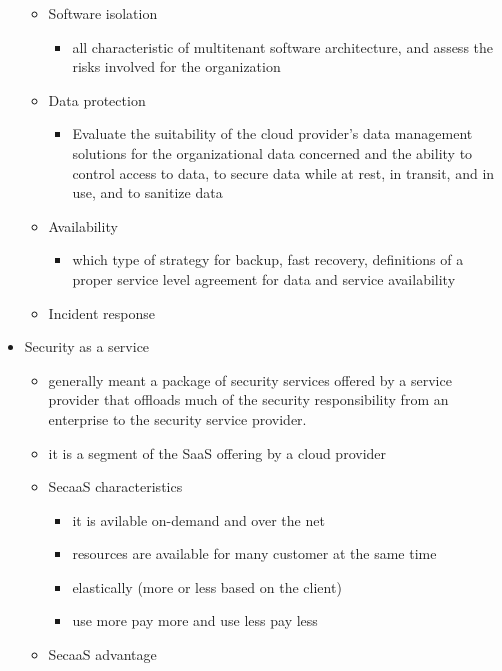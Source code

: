 \documentclass{article}
\begin{document}
\begin{itemize}
\begin{itemize}
\begin{itemize}
        \end{itemize}
        \item Software isolation
        \begin{itemize}
            \item all characteristic of multitenant software architecture, and assess the risks involved for the organization
        \end{itemize}
        \item Data protection
        \begin{itemize}
            \item Evaluate the suitability of the cloud provider’s data management solutions for the organizational data concerned and the ability to control access to data, to secure data while at rest, in transit, and in use, and to sanitize data
        \end{itemize}
        \item Availability
        \begin{itemize}
            \item which type of strategy for backup, fast recovery, definitions of a proper service level agreement for data and service availability
        \end{itemize}
        \item Incident response
    \end{itemize}
    \item Security as a service
    \begin{itemize}
        \item  generally meant a package of security services offered by a service provider that offloads much of the security responsibility from an enterprise to the security service provider.
        \item it is a segment of the SaaS offering by a cloud provider
        \item SecaaS characteristics
        \begin{itemize}
            \item it is avilable on-demand and over the net
            \item resources are available for many customer at the same time
            \item elastically (more or less based on the client)
            \item use more pay more and use less pay less
        \end{itemize}
        \item SecaaS advantage
        \begin{itemize}

\end{itemize}
\end{itemize}
\end{itemize}
\end{document}
